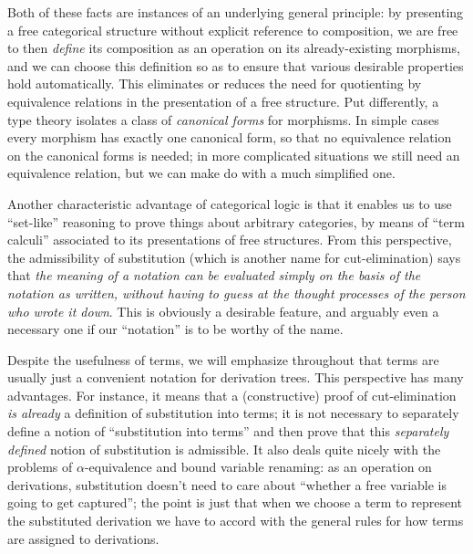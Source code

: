 \documentclass{book}
\begin{document}
Both of these facts are instances of an underlying general principle: by presenting a free categorical structure without explicit reference to composition, we are free to then \emph{define} its composition as an operation on its already-existing morphisms, and we can choose this definition so as to ensure that various desirable properties hold automatically.
This eliminates or reduces the need for quotienting by equivalence relations in the presentation of a free structure.
Put differently, a type theory isolates a class of \emph{canonical forms} for morphisms.
In simple cases every morphism has exactly one canonical form, so that no equivalence relation on the canonical forms is needed; in more complicated situations we still need an equivalence relation, but we can make do with a much simplified one.

Another characteristic advantage of categorical logic is that it enables us to use ``set-like'' reasoning to prove things about arbitrary categories, by means of ``term calculi'' associated to its presentations of free structures.
From this perspective, the admissibility of substitution (which is another name for cut-elimination) says that \emph{the meaning of a notation can be evaluated simply on the basis of the notation as written, without having to guess at the thought processes of the person who wrote it down}.
This is obviously a desirable feature, and arguably even a necessary one if our ``notation'' is to be worthy of the name.

Despite the usefulness of terms, we will emphasize throughout that terms are usually just a convenient notation for derivation trees.
This perspective has many advantages.
For instance, it means that a (constructive) proof of cut-elimination \emph{is already} a definition of substitution into terms; it is not necessary to separately define a notion of ``substitution into terms'' and then prove that this \emph{separately defined} notion of substitution is admissible.
It also deals quite nicely with the problems of $\alpha$-equivalence and bound variable renaming: as an operation on derivations, substitution doesn't need to care about ``whether a free variable is going to get captured''; the point is just that when we choose a term to represent the substituted derivation we have to accord with the general rules for how terms are assigned to derivations.
\end{document}
